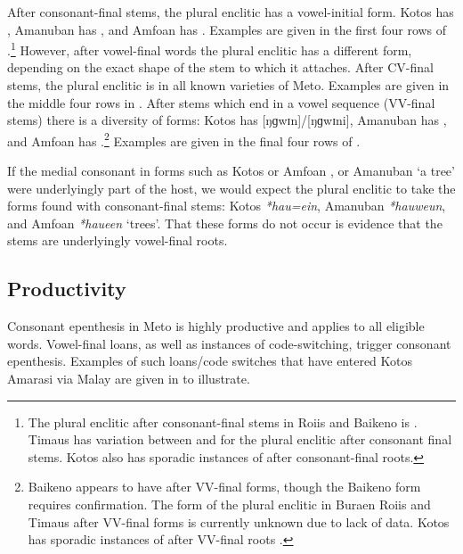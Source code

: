 \documentclass[output=paper]{langscibook}
\begin{document}
\largerpage[-2]
After consonant-final stems, the plural enclitic has a vowel-initial form.
Kotos has , Amanuban has , and Amfo{\Q}an has .
Examples are given in the first four rows of .\footnote{%
		The plural enclitic after consonant-final stems
		in Roi{\Q}is and Baikeno is .
		Timaus has variation between  and 
		for the plural enclitic after consonant final stems.
		Kotos also has sporadic instances of  after consonant-final roots.}
However, after vowel-final words the plural enclitic has a different form,
depending on the exact shape of the stem to which it attaches.
After CV-final stems, the plural enclitic is  in all known varieties
of Meto. Examples are given in the middle four rows in .
After stems which end in a vowel sequence (VV-final stems) there is a diversity
of forms: Kotos has  [ŋɡwɪn]/[ŋɡwɪni], Amanuban has ,
and Amfo{\Q}an has .\footnote{%
		Baikeno appears to have  after VV-final forms,
		though the Baikeno form requires confirmation.
		The form of the plural enclitic in Buraen Roi{\Q}is and Timaus
		after VV-final forms is currently unknown due to lack of data.
		Kotos has sporadic instances of  after VV-final roots \citep[234--244]{ed20}.
		}
Examples are given in the final four rows of .




If the medial consonant in forms such as
Kotos or Amfo{\Q}an , or Amanuban  `a tree' 
were underlyingly part of the host, we would
expect the plural enclitic to take the forms
found with consonant-final stems: Kotos \textit{*hau{\gw}=ein},
Amanuban \textit{*hauweun}, and Amfo{\Q}an \textit{*hau{\gw}een} `trees'.
That these forms do not occur is evidence that the stems
are underlyingly vowel-final roots.

\subsection{Productivity}\label{sec:Prod}
Consonant epenthesis in Meto is highly productive
and applies to all eligible words.
Vowel-final loans, as well as instances of code-switching, trigger consonant epenthesis.
Examples of such loans/code switches that have entered Kotos Amarasi
via Malay are given in  to illustrate.
\end{document}
